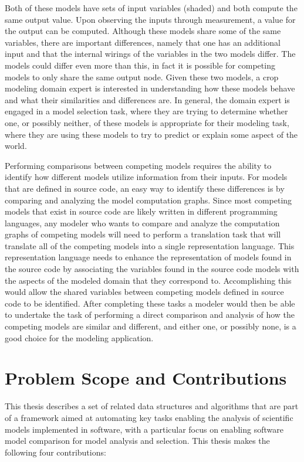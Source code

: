 Both of these models have sets of input variables (shaded) and both compute the same output value.
Upon observing the inputs through measurement, a value for the output can be computed.
Although these models share some of the same variables, there are important differences, namely that one has an additional input and that the internal wirings of the variables in the two models differ.
The models could differ even more than this, in fact it is possible for competing models to only share the same output node.
Given these two models, a crop modeling domain expert is interested in understanding how these models behave and what their similarities and differences are.
In general, the domain expert is engaged in a model selection task, where they are trying to determine whether one, or possibly neither, of these models is appropriate for their modeling task, where they are using these models to try to predict or explain some aspect of the world.

Performing comparisons between competing models requires the ability to identify how different models utilize information from their inputs.
For models that are defined in source code, an easy way to identify these differences is by comparing and analyzing the model computation graphs.
Since most competing models that exist in source code are likely written in different programming languages, any modeler who wants to compare and analyze the computation graphs of competing models will need to perform a translation task that will translate all of the competing models into a single representation language.
This representation language needs to enhance the representation of models found in the source code by associating the variables found in the source code models with the aspects of the modeled domain that they correspond to.
Accomplishing this would allow the shared variables between competing models defined in source code to be identified.
After completing these tasks a modeler would then be able to undertake the task of performing a direct comparison and analysis of how the competing models are similar and different, and either one, or possibly none, is a good choice for the modeling application.

\section{Problem Scope and Contributions\label{sec:prob_scope}}
This thesis describes a set of related data structures and algorithms that are part of a framework aimed at automating key tasks enabling the analysis of scientific models implemented in software, with a particular focus on enabling software model comparison for model analysis and selection. This thesis makes the following four contributions:

